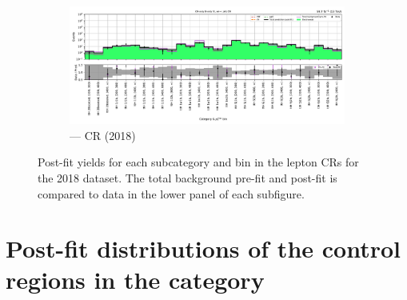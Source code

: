 \begin{figure}[htbp]
    \begin{subfigure}[b]{0.65\textwidth}
        \includegraphics[width=\textwidth]{chapters/higgstoinv/figures/mountain_ranges/2018/ttH/Zee_tree_fit_b-abs_values_ttH_cats.pdf}
        \caption{\ttH --- \doubleEleCr \gls{CR} (2018)}
    \end{subfigure}
    \caption[Post-fit yields for each \ttH subcategory and \ptmiss bin in the lepton control regions for the 2018 dataset]{Post-fit yields for each \ttH subcategory and \ptmiss bin in the lepton \glspl{CR} for the 2018 dataset. The total background pre-fit and post-fit is compared to data in the lower panel of each subfigure.}
    \label{fig:htoinv_mountain_range_ttH_2018_CRs}
\end{figure}

\clearpage




\section{Post-fit distributions of the control regions in the \texorpdfstring{\VH}{VH} category}
\label{sec:pre_post_fit_plots_VH_CRs}

